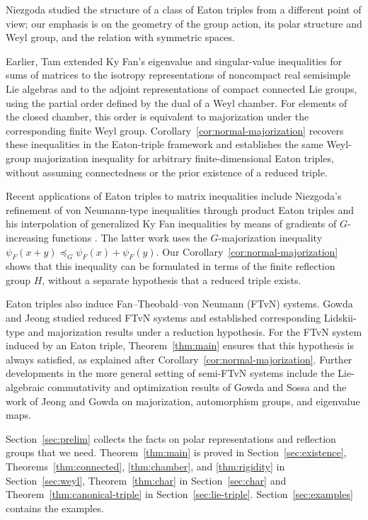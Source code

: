 \documentclass[11pt]{amsart}
\theoremstyle{plain}
\theoremstyle{definition}
\theoremstyle{remark}
\begin{document}
Niezgoda \cite{Niezgoda2002} studied the structure of a class of Eaton triples from a different point of view; our emphasis is on the geometry of the group action, its polar structure and Weyl group, and the relation with symmetric spaces.

Earlier, Tam \cite[Theorems~2 and~7]{Tam1998} extended Ky Fan's eigenvalue and singular-value inequalities for sums of matrices to the isotropy representations of noncompact real semisimple Lie algebras and to the adjoint representations of compact connected Lie groups, using the partial order defined by the dual of a Weyl chamber. For elements of the closed chamber, this order is equivalent to majorization under the corresponding finite Weyl group. Corollary~\ref{cor:normal-majorization} recovers these inequalities in the Eaton-triple framework and establishes the same Weyl-group majorization inequality for arbitrary finite-dimensional Eaton triples, without assuming connectedness or the prior existence of a reduced triple.

Recent applications of Eaton triples to matrix inequalities include Niezgoda's refinement of von Neumann-type inequalities through product Eaton triples \cite{Niezgoda2023} and his interpolation of generalized Ky Fan inequalities by means of gradients of $G$-increasing functions \cite{Niezgoda2024}. The latter work uses the $G$-majorization inequality $\psi_F(x+y)\preceq_G\psi_F(x)+\psi_F(y)$. Our Corollary~\ref{cor:normal-majorization} shows that this inequality can be formulated in terms of the finite reflection group $H$, without a separate hypothesis that a reduced triple exists.

Eaton triples also induce Fan--Theobald--von Neumann (FTvN) systems. Gowda and Jeong \cite[Section~10]{GowdaJeong2023} studied reduced FTvN systems and established corresponding Lidskii-type and majorization results under a reduction hypothesis. For the FTvN system induced by an Eaton triple, Theorem~\ref{thm:main} ensures that this hypothesis is always satisfied, as explained after Corollary~\ref{cor:normal-majorization}. Further developments in the more general setting of semi-FTvN systems include the Lie-algebraic commutativity and optimization results of Gowda and Sossa \cite{GowdaSossa2026} and the work of Jeong and Gowda \cite{JeongGowda2026} on majorization, automorphism groups, and eigenvalue maps.

Section~\ref{sec:prelim} collects the facts on polar representations and reflection groups that we need. Theorem~\ref{thm:main} is proved in Section~\ref{sec:existence}, Theorems~\ref{thm:connected}, \ref{thm:chamber}, and \ref{thm:rigidity} in Section~\ref{sec:weyl}, Theorem~\ref{thm:char} in Section~\ref{sec:char} and Theorem~\ref{thm:canonical-triple} in Section~\ref{sec:lie-triple}. Section~\ref{sec:examples} contains the examples.
\end{document}

